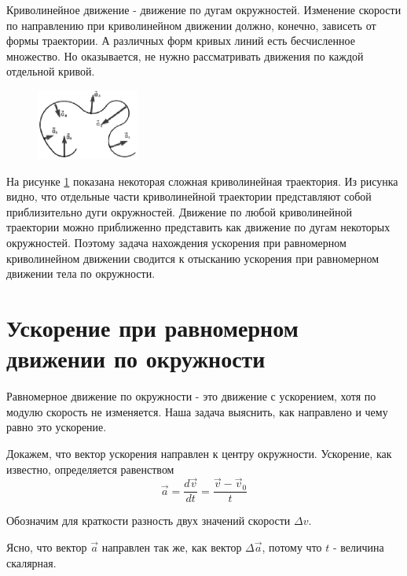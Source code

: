 \documentclass[a6paper, 11pt]{diss_4}
\renewcommand{\'}{\,'}
\begin{document}
  Криволинейное движение - движение по дугам окружностей. Изменение
скорости по направлению при криволинейном движении должно, конечно, зависеть от
формы траектории. А различных форм кривых линий есть бесчисленное множество. Но
оказывается, не нужно рассматривать движения по каждой отдельной кривой.

\begin{figure}
\includegraphics[width=0.3\textwidth]{img/img_20.eps}
\caption{}
\label{r62}
\end{figure}

  На рисунке \ref{r62} показана некоторая сложная криволинейная траектория. Из
рисунка видно, что отдельные части криволинейной траектории представляют собой
приблизительно дуги окружностей. Движение по любой криволинейной траектории
можно приближенно представить как движение по дугам некоторых окружностей.
Поэтому задача нахождения ускорения при равномерном криволинейном движении
сводится к отысканию ускорения при равномерном движении тела по окружности.

\section{Ускорение при  равномерном движении   по окружности}

  Равномерное движение по окружности - это движение с ускорением, хотя по
модулю скорость не изменяется. Наша задача выяснить, как направлено и чему
равно это ускорение.

  Докажем, что вектор ускорения направлен к центру окружности. Ускорение,
как известно, определяется равенством
\[
\vec{a}=\frac{d\vec{v}}{dt}=\frac{\vec{v}-\vec{v}_0}{t}
\]

Обозначим для краткости разность двух значений скорости $\Delta v$.

  Ясно, что вектор $\vec{a}$ направлен так же, как вектор $\Delta\vec{a}$,
потому что $t$ - величина скалярная.
\end{document}
